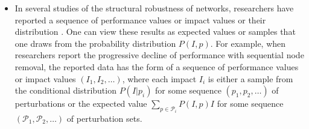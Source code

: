 \documentclass{comnet-mod}
\begin{document}
\begin{itemize}
{    Because the order of the perturbations in this sequence does not change the value of the mean, one can replace the sequence by the set $\mathcal P = \{p_1, p_2, \ldots, p_{N-1}\}$ of perturbations. One can then express Schneider et al.'s $R$ index as the area between the mean-impact function $\langle I \rangle (p) := \sum_I P(I|p) I$ and the $\langle I \rangle=I_{\textrm{max}}$ line: 
    \begin{align}
   	 R = \frac{1}{|\mathcal{P}|}\sum_{p\in\mathcal{P}}\left(I_{\textrm{max}}-\langle I \rangle (p)\right)\,.\label{eq:r-from-mean-impact}
    \end{align}
    If one normalizes the impacts such that $I_{\textrm{max}} = 1$, one can simplify  to obtain
    \begin{align}
  	  R = 1 - \frac{1}{|\mathcal{P}|}\sum_{p\in\mathcal{P}}\langle I \rangle (p)\,,
    \end{align}
    which one can express in terms of conditional probabilities $P(I|p)$ by writing
    \begin{align}
 	   R = 1 - \frac{1}{|\mathcal{P}|}\sum_{p\in\mathcal{P}}\sum_I P(I|p) I
    \end{align}
    or in terms of the unconditional probabilities $P(I,p)$ by writing
    \begin{align}
   	 R = 1 - \frac{1}{|\mathcal{P}|}\sum_{p\in\mathcal{P}}\sum_I \frac{P(I,p) I}{\sum_I P(I,p)}\,.\nonumber
    \end{align}
    }
    \item{In several studies of the structural robustness of networks, researchers have reported a sequence of performance values or impact values \cite{Albert2000, Iyer2013, Ventresca2014, Ren2016, Kazawa2020, Ferrari2023} or their distribution \cite{Henneaux2015, Henneaux2015a, Panteli2015, Phan2018}. One can view these results as expected values or samples that one draws from the probability distribution $P(I,p)$. For example, when researchers report the progressive decline of performance with sequential node removal, the reported data has the form of a sequence of performance values or impact values $(I_1,I_2,\ldots)$, where each impact $I_i$ is either a sample from the conditional distribution $P(I|p_i)$ for some sequence $(p_1,p_2, \ldots)$ of perturbations or the expected value $\sum_{p\in{\mathcal P}_i} P(I,p) I$ for some sequence $({\mathcal P}_1,{\mathcal P}_2, \ldots)$ of perturbation sets.}
\end{itemize}
\end{document}
